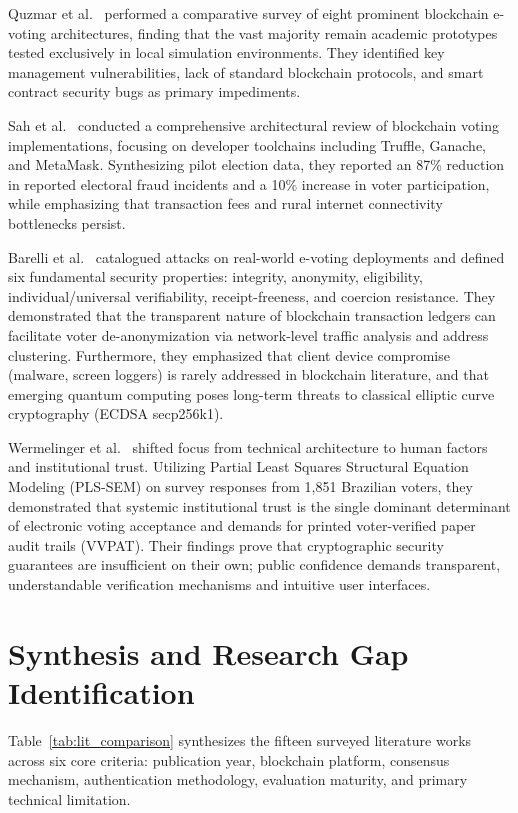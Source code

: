 \documentclass[12pt,a4paper]{report}
\begin{document}
Quzmar et al.~\cite{Quzmar2021} performed a comparative survey of eight prominent blockchain e-voting architectures, finding that the vast majority remain academic prototypes tested exclusively in local simulation environments. They identified key management vulnerabilities, lack of standard blockchain protocols, and smart contract security bugs as primary impediments.

Sah et al.~\cite{Sah2025} conducted a comprehensive architectural review of blockchain voting implementations, focusing on developer toolchains including Truffle, Ganache, and MetaMask. Synthesizing pilot election data, they reported an 87\% reduction in reported electoral fraud incidents and a 10\% increase in voter participation, while emphasizing that transaction fees and rural internet connectivity bottlenecks persist.

Barelli et al.~\cite{Barelli2025} catalogued attacks on real-world e-voting deployments and defined six fundamental security properties: integrity, anonymity, eligibility, individual/universal verifiability, receipt-freeness, and coercion resistance. They demonstrated that the transparent nature of blockchain transaction ledgers can facilitate voter de-anonymization via network-level traffic analysis and address clustering. Furthermore, they emphasized that client device compromise (malware, screen loggers) is rarely addressed in blockchain literature, and that emerging quantum computing poses long-term threats to classical elliptic curve cryptography (ECDSA secp256k1).

Wermelinger et al.~\cite{Wermelinger2026} shifted focus from technical architecture to human factors and institutional trust. Utilizing Partial Least Squares Structural Equation Modeling (PLS-SEM) on survey responses from 1,851 Brazilian voters, they demonstrated that systemic institutional trust is the single dominant determinant of electronic voting acceptance and demands for printed voter-verified paper audit trails (VVPAT). Their findings prove that cryptographic security guarantees are insufficient on their own; public confidence demands transparent, understandable verification mechanisms and intuitive user interfaces.


\section{Synthesis and Research Gap Identification}
Table~\ref{tab:lit_comparison} synthesizes the fifteen surveyed literature works across six core criteria: publication year, blockchain platform, consensus mechanism, authentication methodology, evaluation maturity, and primary technical limitation.
\end{document}
